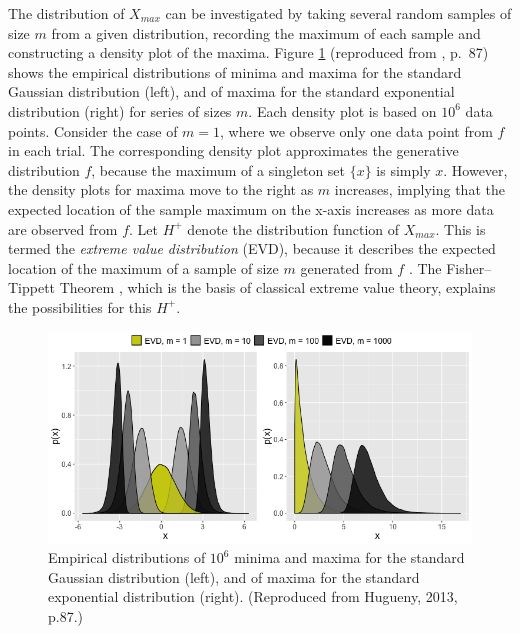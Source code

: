\documentclass{monashthesis}
\theoremstyle{definition}
\theoremstyle{definition}
\theoremstyle{definition}
\theoremstyle{remark}
\begin{document}
The distribution of \(X_{max}\) can be investigated by taking several random samples of size \(m\) from a given distribution, recording the maximum of each sample and constructing a density plot of the maxima. Figure \ref{fig:EVDchange} (reproduced from \textcite{hugueny2013novelty}, p.~87) shows the empirical distributions of minima and maxima for the standard Gaussian distribution (left), and of maxima for the standard exponential distribution (right) for series of sizes \(m\). Each density plot is based on \(10^6\) data points. Consider the case of \(m=1\), where we observe only one data point from \(f\) in each trial. The corresponding density plot approximates the generative distribution \(f\), because the maximum of a singleton set \(\{x\}\) is simply \(x\). However, the density plots for maxima move to the right as \(m\) increases, implying that the expected location of the sample maximum on the x-axis increases as more data are observed from \(f\). Let \(H^{+}\) denote the distribution function of \(X_{max}\). This is termed the \emph{extreme value distribution} (EVD), because it describes the expected location of the maximum of a sample of size \(m\) generated from \(f\) \autocite{clifton2011novelty}. The Fisher--Tippett Theorem \autocite{fisher1928limiting}, which is the basis of classical extreme value theory, explains the possibilities for this \(H^{+}\).

\begin{figure}[h]

{\centering \includegraphics[width=1\linewidth]{figure/EVDchange-1} 

}

\caption{Empirical distributions of $10^6$ minima and maxima for the standard Gaussian distribution (left), and of maxima for the standard exponential distribution (right). (Reproduced from Hugueny, 2013, p.87.)}\label{fig:EVDchange}
\end{figure}
\end{document}
